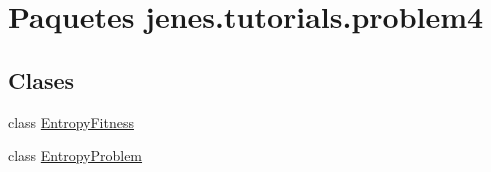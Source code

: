 \hypertarget{namespacejenes_1_1tutorials_1_1problem4}{\section{Paquetes jenes.\-tutorials.\-problem4}
\label{namespacejenes_1_1tutorials_1_1problem4}
}
\subsection*{Clases}
\begin{DoxyCompactItemize}
\item 
class \hyperlink{classjenes_1_1tutorials_1_1problem4_1_1_entropy_fitness}{Entropy\-Fitness}
\item 
class \hyperlink{classjenes_1_1tutorials_1_1problem4_1_1_entropy_problem}{Entropy\-Problem}
\end{DoxyCompactItemize}
